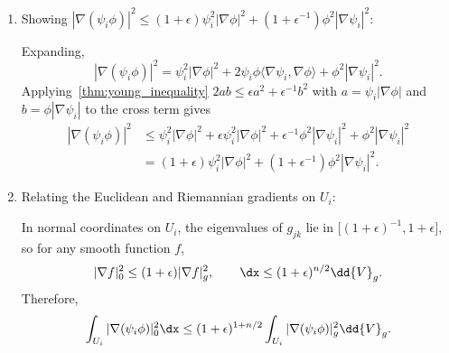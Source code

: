 \begin{computational-work}
\begin{enumerate}
    \item Showing $|\nabla(\psi_i\phi)|^2 \le (1+\epsilon)\psi_i^2|\nabla\phi|^2 + (1+\epsilon^{-1})\phi^2|\nabla\psi_i|^2$:

      Expanding,
      \[%
        |\nabla(\psi_i\phi)|^2 = \psi_i^2|\nabla\phi|^2 + 2\psi_i\phi\langle\nabla\psi_i,\nabla\phi\rangle + \phi^2|\nabla\psi_i|^2
      .\]%
      Applying~\cref{thm:young_inequality} $2ab \le \epsilon a^2 + \epsilon^{-1}b^2$ with $a = \psi_i|\nabla\phi|$ and $b = \phi|\nabla\psi_i|$ to the cross term gives
      \begin{align*}
        |\nabla(\psi_i\phi)|^2 &\le \psi_i^2|\nabla\phi|^2 + \epsilon\psi_i^2|\nabla\phi|^2 + \epsilon^{-1}\phi^2|\nabla\psi_i|^2 + \phi^2|\nabla\psi_i|^2\\
                                &= (1+\epsilon)\psi_i^2|\nabla\phi|^2 + (1+\epsilon^{-1})\phi^2|\nabla\psi_i|^2
      .\end{align*}

    \item Relating the Euclidean and Riemannian gradients on $U_i$:

      In normal coordinates on $U_i$, the eigenvalues of $g_{jk}$ lie in $\bigl[(1+\epsilon)^{-1}, 1+\epsilon\bigr]$, so for any smooth function $f$,
      \[%
        |\nabla f|^2_0 \le (1+\epsilon) |\nabla f|^2_g, \qquad \dx \le (1+\epsilon)^{n/2}\dd{V}_g
      .\]%
      Therefore,
      \[%
        \int_{U_i} |\nabla(\psi_i\phi)|^2_0 \dx \le (1+\epsilon)^{1 + n/2} \int_{U_i} |\nabla(\psi_i\phi)|^2_g \dd{V}_g
      .\]%
  \end{enumerate}
\end{computational-work}

